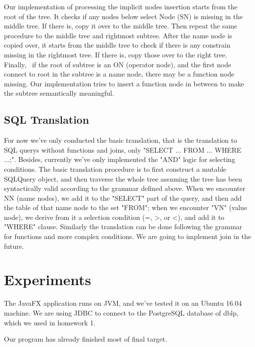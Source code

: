 \documentclass[twocolumn]{article}
\begin{document}
Our implementation of processing the implicit nodes insertion starts from the root of the tree. It checks if any nodes below select Node (SN) is missing in the middle tree. If there is, copy it over to the middle tree. Then repeat the same procedure to the middle tree and rightmost subtree. After the name node is copied over, it starts from the middle tree to check if there is any constrain missing in the rightmost tree. If there is, copy those over to the right tree. Finally,  if the root of subtree is an ON (operator node), and the first node connect to root in the subtree is a name node, there may be a function node missing. Our implementation tries to insert a function node in between to make the subtree semantically meaningful. 

\subsection{SQL Translation}
For now we've only conducted the basic translation, that is the translation to SQL querys without functions and joins, only "SELECT ... FROM ... WHERE ...;". Besides, currently we've only implemented the "AND" logic for selecting conditions. The basic translation procedure is to first construct a mutable SQLQuery object, and then traverse the whole tree assuming the tree has been syntactically valid according to the grammar defined above. When we encounter NN (name nodes), we add it to the "SELECT" part of the query, and then add the table of that name node to the set "FROM"; when we encounter "VN" (value node), we derive from it a selection condition (=, >, or <), and add it to "WHERE" clause. Similarly the translation can be done following the grammar for functions and more complex conditions. We are going to implement join in the future.

\section{Experiments}
The JavaFX application runs on JVM, and we’ve tested it on an Ubuntu 16.04 machine. We are using JDBC to connect to the PostgreSQL database of dblp, which we used in homework 1.

Our program has already finished most of final target. 
\end{document}

